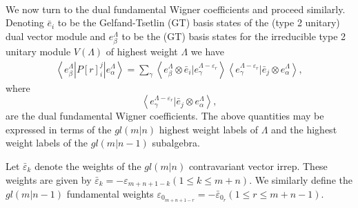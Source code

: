 \documentclass[12pt]{article}
\begin{document}
~~~~~~~~~~~~~~~~~~~~~~~~~~~~~~~~~~~~~~~~~~~~~~~~~~~~~~~~
~~\\
We now turn to the dual fundamental Wigner coefficients and proceed similarly. 
Denoting $\bar{e}_i$ to be the Gelfand-Tsetlin (GT) basis states of the (type 2 unitary) dual vector module and ${e^\Lambda_\beta}$ to be the (GT) basis states for the irreducible type 2 unitary module $V(\Lambda)$ of highest weight $\Lambda$ we have 
\begin{align}
\left\langle e^\Lambda_\beta | P[r]^j_i | e^{\Lambda}_\alpha \right\rangle =
\sum_\gamma \left\langle e^\Lambda_\beta \otimes \bar{e}_i | e^{\Lambda - \varepsilon_r}_\gamma \right\rangle
\left\langle e^{\Lambda-\varepsilon_r}_\gamma | \bar{e}_j \otimes e^\Lambda_\alpha \right\rangle, \label{Pij}
\end{align}
where
$$
\left\langle e^{\Lambda-\varepsilon_r}_\gamma | \bar{e}_j \otimes e^\Lambda_\alpha \right\rangle,
$$
are the dual fundamental Wigner coefficients. The above quantities may be expressed in terms of the $gl(m|n)$ highest weight labels of $\Lambda$ and the highest weight labels of the $gl(m|n-1)$ subalgebra.

Let $\bar{\varepsilon}_k$ denote the weights of the $gl(m|n)$ contravariant vector irrep. These weights are given by $\bar{\varepsilon}_k = -\varepsilon_{m+n+1-k} (1 \leq k \leq m+n)$. We similarly define the $gl(m|n-1)$ fundamental weights 
$\varepsilon_{0_{m+n+1-r}} = - \bar{\varepsilon}_{0_r} (1 \leq r \leq m+n-1) $.
\end{document}
